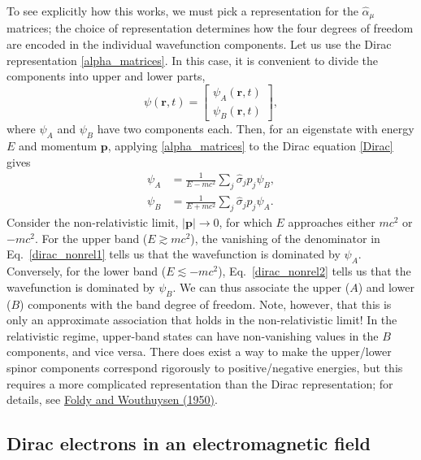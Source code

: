 \documentclass[pra,12pt]{revtex4}
\begin{document}
To see explicitly how this works, we must pick a representation for
the $\hat{\alpha}_\mu$ matrices; the choice of representation
determines how the four degrees of freedom are encoded in the
individual wavefunction components.  Let us use the Dirac
representation \eqref{alpha_matrices}.  In this case, it is convenient
to divide the components into upper and lower parts,
\begin{equation}
  \psi(\mathbf{r},t) = \begin{bmatrix}\psi_A(\mathbf{r},t)
    \\ \psi_B(\mathbf{r},t)
  \end{bmatrix},
\end{equation}
where $\psi_A$ and $\psi_B$ have two components each.  Then, for an
eigenstate with energy $E$ and momentum $\mathbf{p}$, applying
\eqref{alpha_matrices} to the Dirac equation \eqref{Dirac} gives
\begin{align}
  \psi_A &= \frac{1}{E - mc^2} \sum_j \hat{\sigma}_j p_j \psi_B,
  \label{dirac_nonrel1} \\
  \psi_B &= \frac{1}{E + mc^2} \sum_j \hat{\sigma}_j p_j \psi_A.
  \label{dirac_nonrel2}
\end{align}
Consider the non-relativistic limit, $|\mathbf{p}| \rightarrow 0$, for
which $E$ approaches either $mc^2$ or $-mc^2$.  For the upper band ($E
\gtrsim mc^2$), the vanishing of the denominator in
Eq.~\eqref{dirac_nonrel1} tells us that the wavefunction is dominated
by $\psi_A$.  Conversely, for the lower band ($E \lesssim -mc^2$),
Eq.~\eqref{dirac_nonrel2} tells us that the wavefunction is dominated
by $\psi_B$.  We can thus associate the upper ($A$) and lower ($B$)
components with the band degree of freedom.  Note, however, that this
is only an approximate association that holds in the non-relativistic
limit!  In the relativistic regime, upper-band states can have
non-vanishing values in the $B$ components, and vice versa.  There
does exist a way to make the upper/lower spinor components correspond
rigorously to positive/negative energies, but this requires a more
complicated representation than the Dirac representation; for details,
see \hyperref[cite:foldy]{Foldy and Wouthuysen (1950)}.

\subsection{Dirac electrons in an electromagnetic field}
\label{sec:diracem}
\end{document}
